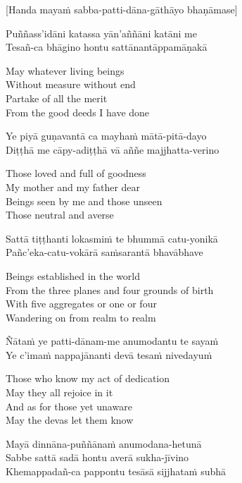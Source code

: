 \begin{center}
  [Handa mayaṁ sabba-patti-dāna-gāthāyo bhaṇāmase]
\end{center}

Puññass’idāni katassa yān’aññāni katāni me\\
Tesañ-ca bhāgino hontu sattānantāppamāṇakā

\begin{cprenglish}
  May whatever living beings\\
  Without measure without end\\
  Partake of all the merit\\
  From the good deeds I have done
\end{cprenglish}

Ye piyā guṇavantā ca mayhaṁ mātā-pitā-dayo\\
Diṭṭhā me cāpy-adiṭṭhā vā aññe majjhatta-verino

\begin{cprenglish}
  Those loved and full of goodness\\
  My mother and my father dear\\
  Beings seen by me and those unseen\\
  Those neutral and averse
\end{cprenglish}

Sattā tiṭṭhanti lokasmiṁ te bhummā catu-yonikā\\
Pañc’eka-catu-vokārā saṁsarantā bhavābhave

\begin{cprenglish}
  Beings established in the world\\
  From the three planes and four grounds of birth\\
  With five aggregates or one or four\\
  Wandering on from realm to realm
\end{cprenglish}

Ñātaṁ ye patti-dānam-me anumodantu te sayaṁ\\
Ye c’imaṁ nappajānanti devā tesaṁ nivedayuṁ

\begin{cprenglish}
  Those who know my act of dedication\\
  May they all rejoice in it\\
  And as for those yet unaware\\
  May the devas let them know
\end{cprenglish}

Mayā dinnāna-puññānaṁ anumodana-hetunā\\
Sabbe sattā sadā hontu averā sukha-jīvino\\
Khemappadañ-ca pappontu tesāsā sijjhataṁ subhā

